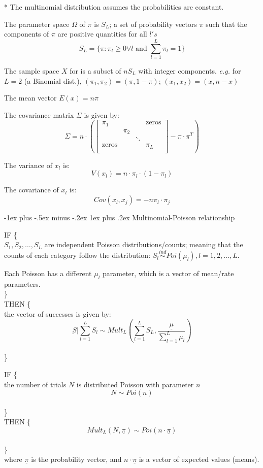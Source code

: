 \documentclass[10pt,landscape]{article}
\makeatletter
\renewcommand{\subsubsection}{\@startsection{subsubsection}{3}{0mm}%
                                {-1ex plus -.5ex minus -.2ex}%
                                {1ex plus .2ex}%
                                {\normalfont\small\bfseries}}
\makeatother
\begin{document}
\begin{multicols}{3}
* The multinomial distribution assumes the probabilities are constant.

\medskip
The parameter space $\Omega$ of $\pi$ is $S_L$; a set of probability vectors $\pi$ such that the components of $\pi$ are positive quantities for all $l's$
$$ S_L = \{\pi : \pi_l \geq 0 \forall l \text{ and } \sum_{l = 1}^{L} \pi_l = 1 \} $$

\medskip
The sample space $X$ for  is a subset of $n S_L$ with integer components. \emph{e.g.} for $L = 2$ (a Binomial dist.), $(\pi_1, \pi_2) = (\pi, 1 - \pi)$; $(x_1, x_2) = (x, n - x)$

\medskip
The mean vector $E(x) = n \pi$

\medskip
The covariance matrix $\Sigma$ is given by: $$ \Sigma = n \cdot \left(
\begin{bmatrix}
 \pi_1 &  &  & \text{zeros} \\
   & \pi_2 &  &  \\
   &  & \ddots &  \\
 \text{zeros} &  &  & \pi_L \\
\end{bmatrix}
- \pi \cdot \pi^T \right) $$

\medskip
The variance of $x_l$ is:
$$ V(x_l) = n \cdot \pi_l \cdot (1 - \pi_l) $$

\medskip
The covariance of $x_l$ is:
$$ Cov(x_l, x_j) = - n \pi_l \cdot \pi_j $$

\subsubsection{Multinomial-Poisson relationship}

IF \{ \\
$S_1, S_2, \hdots, S_L$ are independent Poisson distributions/counts; meaning that the counts of each category follow the distribution: $S_l \stackrel{ind}{\sim} Poi(\mu_l), l = 1, 2, \hdots, L $.

Each Poisson has a different $\mu_l$ parameter, which is a vector of mean/rate parameters. \\
\} \\
THEN \{ \\
the vector of successes is given by: $$ \underbar{S} | \sum_{l = 1}^{L} S_l \sim Mult_L \left( \sum_{l = 1}^{L} S_L, \frac{\underline{\mu}}{\sum_{l = 1}^{L} \mu_l} \right) $$ \\
\}

\medskip
IF \{ \\
the number of trials $N$ is distributed Poisson with parameter $n$ $$ N \sim Poi(n) $$ \\
\} \\
THEN \{ \\
$$ Mult_L(N, \underline{\pi}) \sim Poi(n \cdot \underline{\pi}) $$ \\
\} \\
where $\underline{\pi}$ is the probability vector, and $n \cdot \underline{\pi}$ is a vector of expected values (means).


\end{multicols}
\end{document}
